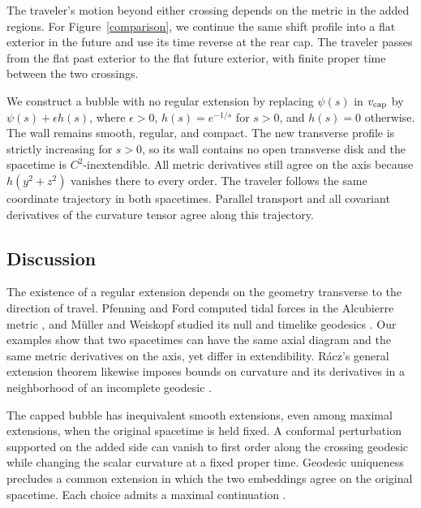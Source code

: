 \documentclass[12pt]{article}
\begin{document}
The traveler's motion beyond either crossing depends on the metric in the
added regions. For Figure~\ref{comparison}, we continue the same shift
profile into a flat exterior in the future and use its time reverse at
the rear cap. The traveler passes from the flat past exterior to the flat
future exterior, with finite proper time between the two crossings.

We construct a bubble with no regular extension by replacing \(\psi(s)\)
in \(v_{\rm cap}\) by
\(\psi(s)+\epsilon h(s)\), where \(\epsilon>0\), \(h(s)=e^{-1/s}\) for
\(s>0\), and \(h(s)=0\) otherwise. The wall remains smooth, regular, and
compact. The new transverse profile is strictly increasing for \(s>0\),
so its wall contains no open transverse disk and the spacetime is
\(C^2\)-inextendible. All metric
derivatives still agree on the axis because \(h(y^2+z^2)\) vanishes there
to every order. The traveler follows the same coordinate trajectory in
both spacetimes. Parallel transport and all covariant derivatives of the
curvature tensor agree along this trajectory.

\begin{samepage}
\section{Discussion}
\label{discussion}

The existence of a regular extension depends on the geometry transverse
to the direction of travel. Pfenning and Ford computed tidal forces in
the Alcubierre metric \cite{PfenningFord1997}, and M\"uller and Weiskopf
studied its null and timelike geodesics \cite{MullerWeiskopf2012}. Our
examples show that two spacetimes can have the same axial diagram and
the same metric derivatives on the axis, yet differ in extendibility.
R\'acz's general extension theorem likewise imposes bounds on curvature
and its derivatives in a neighborhood of an incomplete geodesic
\cite[Sec.~6]{Racz2010}.
\par
\end{samepage}

\begin{samepage}
The capped bubble has inequivalent smooth extensions, even among maximal
extensions, when the original spacetime is held fixed. A conformal
perturbation supported on the added side can vanish to first order along
the crossing geodesic while changing the scalar curvature at a fixed
proper time. Geodesic uniqueness precludes a common extension in which
the two embeddings agree on the original spacetime. Each choice admits
a maximal continuation \cite[Thm.~1]{Clarke1976}.
\par
\end{samepage}
\end{document}
